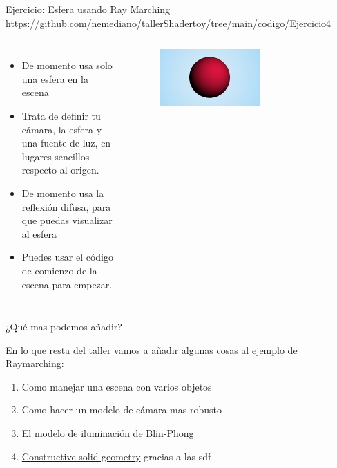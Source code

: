 \begin{frame}{Ejercicio: Esfera usando Ray Marching}
\url{https://github.com/nemediano/tallerShadertoy/tree/main/codigo/Ejercicio4}
\begin{columns}
     \begin{itemize}
         \item De momento usa solo una esfera en la escena
         \item Trata de definir tu cámara, la esfera y una fuente de luz, en lugares sencillos respecto al origen.
         \item De momento usa la reflexión difusa, para que puedas visualizar al esfera
         \item Puedes usar el código de comienzo de la escena para empezar.
     \end{itemize}
        \begin{figure}[htb]
            \centering
            \includegraphics[width=0.6\textwidth]{img/Ejer/Ejer4}
        \end{figure}
\end{columns}
\end{frame}

\begin{frame}{¿Qué mas podemos añadir?}

En lo que resta del taller vamos a añadir algunas cosas al ejemplo de Raymarching:

\begin{enumerate}
    \item Como manejar una escena con varios objetos
    \item Como hacer un modelo de cámara mas robusto
    \item El modelo de iluminación de Blin-Phong
    \item \href{https://en.wikipedia.org/wiki/Constructive_solid_geometry}{Constructive solid geometry} gracias a las sdf
\end{enumerate}

\end{frame}

